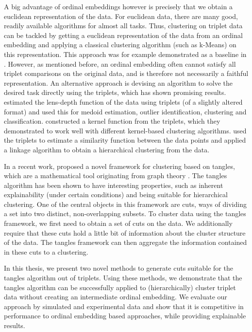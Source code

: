 A big advantage of ordinal embeddings however is precisely that we obtain a euclidean representation of the data. For euclidean data, there are many good, readily available algorithms for almost all tasks. 
Thus, clustering on triplet data can be tackled by getting a euclidean representation of the data
from an ordinal embedding and applying a classical clustering algorithm (such as k-Means) on 
this representation. This approach was for example demonstrated as a baseline in \citep{kleindessnerLensDepthFunction2017}. However, as mentioned before, an ordinal embedding 
often cannot satisfy all triplet comparisons on the original data, and is therefore not 
necessarily a faithful representation. 
An alternative approach is devising an algorithm to solve the desired task directly 
using the triplets, which has shown promising results.
\cite{kleindessnerLensDepthFunction2017} estimated the lens-depth function
of the data using triplets (of a slightly altered format) and used this for 
medoid estimation, outlier identification, clustering and classification. 
\cite{kleindessnerKernelFunctionsBased2017} constructed a kernel function from
the triplets, which they demonstrated to work well with 
different kernel-based clustering algorithms.
\cite{ghoshdastidarFoundationsComparisonBasedHierarchical2019} used the 
triplets to estimate a similarity function between the data points and applied 
a linkage algorithm to obtain a hierarchical clustering from the data.

In a recent work, \cite{klepperClusteringTanglesAlgorithmic2021} proposed a novel framework
for clustering based on tangles, which are a mathematical tool originating from graph theory 
\citep{robertsonGraphMinorsObstructions1991}. The tangles algorithm has been shown to have 
interesting properties, such as inherent explainability (under certain conditions) and being suitable for hierarchical clustering.
One of the central objects in this framework are cuts, ways of dividing a set into
two distinct, non-overlapping subsets. To cluster data using the tangles framework, we first
need to obtain a set of cuts on the data. We additionally require that these cuts
hold a little bit of information about the cluster structure of the data. The 
tangles framework can then aggregate the information contained in these cuts to a
clustering. 

In this thesis, we present two novel methods to generate cuts suitable for the
tangles algorithm out of triplets. Using these methods, we 
demonstrate that the tangles algorithm can be successfully applied to (hierarchically) cluster triplet data without creating an intermediate ordinal embedding. 
We evaluate our approach by simulated and experimental data and show that it is competitive 
in performance to ordinal embedding based approaches, while providing explainable results. 

